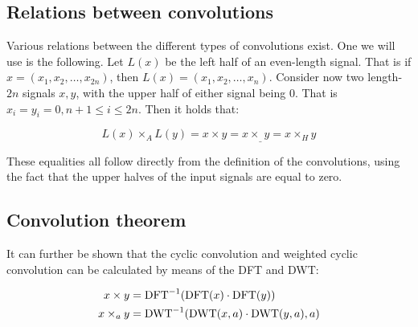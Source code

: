 \subsection{Relations between convolutions}
\label{sec:relations_between_convolutions}

Various relations between the different types of convolutions exist. One we
will use is the following. Let $L(x)$ be the left half of an even-length
signal. That is if $x = (x_1, x_2, \ldots, x_{2n})$, then $L(x) = (x_1, x_2,
\ldots, x_n)$. Consider now two length-$2n$ signals $x, y$, with the upper half
of either signal being $0$. That is $x_i = y_i = 0, n + 1 \leq i \leq 2n$. Then
it holds that: \autocite{crandallPrimeNumbersComputational2005}

\[
		L(x) \times_A L(y) = x \times y = x \times_\_ y = x \times_H y
\]

These equalities all follow directly from the definition of the convolutions,
using the fact that the upper halves of the input signals are equal to zero.

% 
% 

\subsection{Convolution theorem}
\label{sec:convolution_theorem}

It can further be shown that the cyclic convolution and weighted cyclic
convolution can be calculated by means of the DFT and DWT:
\autocite{crandallPrimeNumbersComputational2005}

\begin{align*}
		x \times y & = \operatorname{DFT}^{-1}(\operatorname{DFT}(x) \cdot \operatorname{DFT}(y)) \\
		x \times_a y & = \operatorname{DWT}^{-1}(\operatorname{DWT}(x, a) \cdot \operatorname{DWT}(y, a), a)
\end{align*}

